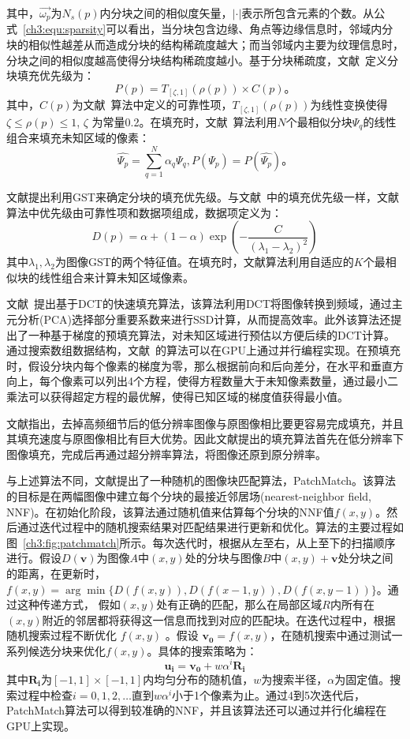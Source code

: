 其中，$\vec{\omega_p}$为$N_s(p)$内分块之间的相似度矢量，$|\cdot|$表示所包含元素的个数。从公式~\ref{ch3:equ:sparsity}可以看出，当分块包含边缘、角点等边缘信息时，邻域内分块的相似性越差从而造成分块的结构稀疏度越大；而当邻域内主要为纹理信息时，分块之间的相似度越高使得分块结构稀疏度越小。基于分块稀疏度，文献~\cite{Xu:2010}定义分块填充优先级为：
$$P(p) = T_{[\zeta,1]}(\rho(p)) \times C(p) 。$$
其中，$C(p)$为文献~算法中定义的可靠性项，$T_{[\zeta,1]}(\rho(p))$为线性变换使得$\zeta \leqslant \rho(p) \leqslant 1$, $\zeta$ 为常量0.2。在填充时，文献~算法利用$N$个最相似分块$\Psi_q$的线性组合来填充未知区域的像素：
$$\hat{\Psi_p}= \sum_{q=1}^{N}{ \alpha_q \Psi_q}, P(\Psi_p) = P(\hat{\Psi_{p}}) 。$$\par
文献提出利用GST来确定分块的填充优先级。与文献~中的填充优先级一样，文献算法中优先级由可靠性项和数据项组成，数据项定义为：
$$ D(p) = \alpha + (1-\alpha)\exp(-\frac{C}{(\lambda_1 - \lambda_2)^2})$$
其中$\lambda_1,\lambda_2$为图像GST的两个特征值。在填充时，文献算法利用自适应的$K$个最相似块的线性组合来计算未知区域像素。\par
文献~提出基于DCT的快速填充算法，该算法利用DCT将图像转换到频域，通过主元分析(PCA)选择部分重要系数来进行SSD计算，从而提高效率。此外该算法还提出了一种基于梯度的预填充算法，对未知区域进行预估以方便后续的DCT计算。通过搜索数组数据结构，文献~的算法可以在GPU上通过并行编程实现。在预填充时，假设分块内每个像素的梯度为零，那么根据前向和后向差分，在水平和垂直方向上，每个像素可以列出4个方程，使得方程数量大于未知像素数量，通过最小二乘法可以获得超定方程的最优解，使得已知区域的梯度值获得最小值。 \par
文献指出，去掉高频细节后的低分辨率图像与原图像相比要更容易完成填充，并且其填充速度与原图像相比有巨大优势。因此文献提出的填充算法首先在低分辨率下图像填充，完成后再通过超分辨率算法，将图像还原到原分辨率。\par
与上述算法不同，文献提出了一种随机的图像块匹配算法，PatchMatch。该算法的目标是在两幅图像中建立每个分块的最接近邻居场(nearest-neighbor field, NNF)。在初始化阶段，该算法通过随机值来估算每个分块的NNF值$f(x,y)$。然后通过迭代过程中的随机搜索结果对匹配结果进行更新和优化。算法的主要过程如图~\ref{ch3:fig:patchmatch}所示。每次迭代时，根据从左至右，从上至下的扫描顺序进行。假设$D(\textbf{v})$为图像$A$中$(x,y)$处的分块与图像$B$中$(x,y)+ \textbf{v} $处分块之间的距离，在更新时，$f(x,y) = \arg \min\{D(f(x,y)),D(f(x-1,y)),D(f(x,y-1))\}$。通过这种传递方式， 假如$(x,y)$处有正确的匹配，那么在局部区域$R$内所有在$(x,y)$附近的邻居都将获得这一信息而找到对应的匹配块。在迭代过程中，根据随机搜索过程不断优化 $f(x,y)$ 。假设 $ \mathbf{{v_{0}}}= f(x,y)$，在随机搜索中通过测试一系列候选分块来优化$f(x,y)$。具体的搜索策略为：
$$ \mathbf{u_i} = \mathbf{v_0} + w\alpha^{i}\mathbf{R_{i}}$$
其中$\mathbf{R_{i}}$为$[-1,1] \times [-1,1]$内均匀分布的随机值，$w$为搜索半径，$\alpha$为固定值。搜索过程中检查$i=0,1,2,\ldots$直到$w\alpha^i$小于1个像素为止。通过4到5次迭代后，PatchMatch算法可以得到较准确的NNF，并且该算法还可以通过并行化编程在GPU上实现。

